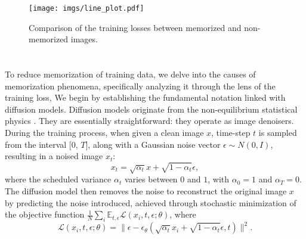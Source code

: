 \begin{figure}[t]
  \centering
  \setlength{\abovecaptionskip}{7pt} %
  \setlength{\belowcaptionskip}{-7pt} %
  \texttt{[image: imgs/line\_plot.pdf]}
  \caption{
  Comparison of the training losses between memorized and non-memorized images. 
  }
  \label{fig:LossAnalysis}
\end{figure}
\section{}
To reduce memorization of training data, we delve into the causes of memorization phenomena, specifically analyzing it through the lens of the training loss, 
We begin by establishing the fundamental notation linked with diffusion models.
Diffusion models \cite{ho2020denoising} originate from the non-equilibrium statistical physics \cite{sohl2015deep}.
They are essentially straightforward: they operate as image denoisers.
During the training process, when given a clean image $x$, time-step $t$ is sampled from the interval [$0$, $T$], along with a Gaussian noise vector $\epsilon \sim \mathit{N} (0, I)$,
resulting in a noised image $x_t$:
\begin{equation}\label{eq:noised_data}
    x_t = \sqrt{\alpha_t}x + \sqrt{1-\alpha_t} \epsilon, 
\end{equation}
where the scheduled variance $\alpha_t$ varies between $0$ and $1$, with $\alpha_0 = 1$ and $\alpha_T = 0$. 
The diffusion model then removes the noise to reconstruct the original image $x$ by predicting the noise introduced, achieved through stochastic minimization of the objective function
$\frac{1}{N} \sum_{i} \mathbb{E}_{t,\epsilon} \mathcal{L} (x_i, t, \epsilon; \theta)$, where
\begin{equation}\label{eq:loss}
  \mathcal{L} (x_i, t, \epsilon; \theta) = \| \epsilon - \epsilon_\theta(\sqrt{\alpha_t}x_i + \sqrt{1-\alpha_t}\epsilon, t) \|^2.
\end{equation}

